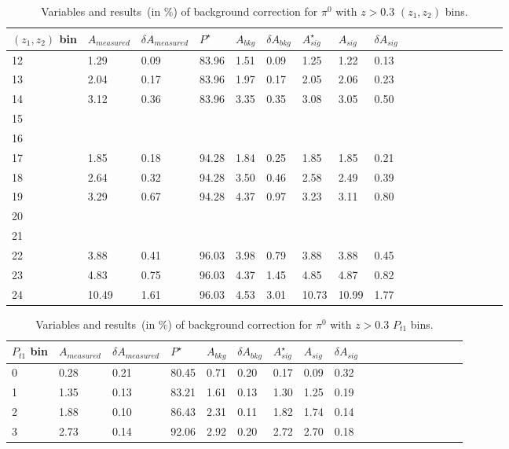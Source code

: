\begin{table}[H]\footnotesize
\centering
\begin{tabular}{|l|l|l|l|l|l|l|l|l|l|l|l|l|l|l|l|l|l|}
\\ \hline
$(z_{1},z_{2})$ bin & $A_{measured}$ & $\delta A_{measured}$ & $P^{\star}$ & $A_{bkg}$ & $\delta A_{bkg}$ & $A_{sig}^{\star}$ & $ A_{sig}$  & $\delta A_{sig}$ \\ \hline
12 & 1.29 & 0.09 & 83.96 & 1.51 & 0.09 & 1.25 & 1.22 & 0.13 \\ \hline 
13 & 2.04 & 0.17 & 83.96 & 1.97 & 0.17 & 2.05 & 2.06 & 0.23 \\ \hline 
14 & 3.12 & 0.36 & 83.96 & 3.35 & 0.35 & 3.08 & 3.05 & 0.50 \\ \hline 
15 &  &  &  &  &  &  &  &  \\ \hline 
16 & &  &  &  &  &  &  &  &  \\ \hline  
17 & 1.85 & 0.18 & 94.28 & 1.84 & 0.25 & 1.85 & 1.85 & 0.21 \\ \hline 
18 & 2.64 & 0.32 & 94.28 & 3.50 & 0.46 & 2.58 & 2.49 & 0.39 \\ \hline 
19 & 3.29 & 0.67 & 94.28 & 4.37 & 0.97 & 3.23 & 3.11 & 0.80 \\ \hline 
20 & &  &  &  &  &  &  &  &  \\ \hline  
21 & &  &  &  &  &  &  &  &  \\ \hline 
22 & 3.88 & 0.41 & 96.03 & 3.98 & 0.79 & 3.88 & 3.88 & 0.45 \\ \hline 
23 & 4.83 & 0.75 & 96.03 & 4.37 & 1.45 & 4.85 & 4.87 & 0.82 \\ \hline 
24 & 10.49 & 1.61 & 96.03 & 4.53 & 3.01 & 10.73 & 10.99 & 1.77 \\ \hline 
 \end{tabular}
\caption{Variables and results~(in $\%$) of background correction for $\pi^0$ with $z>0.3$ $(z_1,z_2)$ bins. }
\label{tab:pi0comzbkgcor}
\end{table} 

\begin{table}[H]\footnotesize
\centering
\begin{tabular}{|l|l|l|l|l|l|l|l|l|l|l|l|l|l|l|l|l|l|}
\\ \hline
$P_{t1}$ bin & $A_{measured}$ & $\delta A_{measured}$ & $P^{\star}$  & $A_{bkg}$ & $\delta A_{bkg}$ & $A_{sig}^{\star}$ & $ A_{sig}$  & $\delta A_{sig}$ \\ \hline
0 & 0.28 & 0.21 & 80.45 & 0.71 & 0.20 & 0.17 & 0.09 & 0.32 \\ \hline 
1 & 1.35 & 0.13 & 83.21 & 1.61 & 0.13 & 1.30 & 1.25 & 0.19 \\ \hline 
2 & 1.88 & 0.10 & 86.43 & 2.31 & 0.11 & 1.82 & 1.74 & 0.14 \\ \hline 
3 & 2.73 & 0.14 & 92.06 & 2.92 & 0.20 & 2.72 & 2.70 & 0.18 \\ \hline 
\end{tabular}
\caption{Variables and results~(in $\%$) of background correction for $\pi^0$ with $z>0.3$ $P_{t1}$ bins. }
\label{tab:pi0sinptbkgcor}
\end{table}

